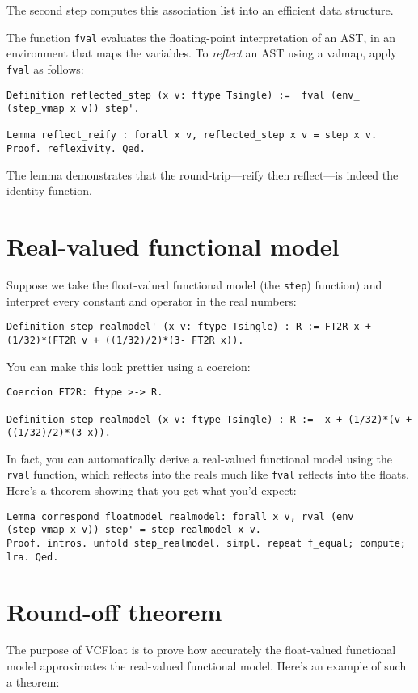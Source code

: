 \documentclass[article]{memoir}
\begin{document}
The second step computes this association list into
an efficient data structure.

The function \lstinline{fval} evaluates the floating-point interpretation
of an AST, in an environment that maps the variables.
To \emph{reflect} an AST using a valmap, apply \lstinline{fval} as follows:

\begin{lstlisting}
Definition reflected_step (x v: ftype Tsingle) :=  fval (env_ (step_vmap x v)) step'.

Lemma reflect_reify : forall x v, reflected_step x v = step x v.
Proof. reflexivity. Qed.
\end{lstlisting}
The lemma demonstrates that the round-trip---reify then reflect---is indeed
the identity function.

\chapter{Real-valued functional model}

Suppose we take the float-valued functional model (the \lstinline{step}) 
function) and interpret every constant and operator in the real numbers:

\begin{lstlisting}
Definition step_realmodel' (x v: ftype Tsingle) : R := FT2R x + (1/32)*(FT2R v + ((1/32)/2)*(3- FT2R x)).
\end{lstlisting}
You can make this look prettier using a coercion:

\begin{lstlisting}
Coercion FT2R: ftype >-> R.

Definition step_realmodel (x v: ftype Tsingle) : R :=  x + (1/32)*(v + ((1/32)/2)*(3-x)).
\end{lstlisting}

In fact, you can automatically derive a real-valued functional model
using the \lstinline{rval} function, which reflects into the reals
much like \lstinline{fval} reflects into the floats.  Here's
a theorem showing that you get what you'd expect:

\begin{lstlisting}
Lemma correspond_floatmodel_realmodel: forall x v, rval (env_ (step_vmap x v)) step' = step_realmodel x v.
Proof. intros. unfold step_realmodel. simpl. repeat f_equal; compute; lra. Qed. 
\end{lstlisting}

\chapter{Round-off theorem}
The purpose of VCFloat is to prove how accurately the
float-valued functional model approximates the real-valued
functional model.  Here's an example of such a theorem:
 
\end{document}
